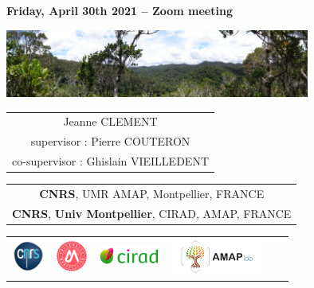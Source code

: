 {

  \begin{frame}
    \begin{center}
        \small{\textbf{Friday, April 30th 2021 -- Zoom meeting}}
    \end{center}
    \vspace{-0.5cm}
    \titlepage %
    \vspace{-2.5cm}
    \begin{center}
      \includegraphics[width=10cm]{figs/Banniere.png}
    \end{center}
    \begin{center}

        \begin{tabular}{c}
          Jeanne CLEMENT \\
          supervisor : Pierre COUTERON \\
          co-supervisor : Ghislain VIEILLEDENT 
        \end{tabular}

      \vspace{0.25cm}

        \begin{tabular}{c}
          \textbf{CNRS}, UMR AMAP, Montpellier, FRANCE\\
          \textbf{CNRS}, \textbf{Univ Montpellier},  CIRAD, AMAP, FRANCE
        \end{tabular}

      \vspace{0.25cm}

      \begin{tabular}{C{2cm}C{2cm}C{2cm}C{2cm}C{3cm}}
        \includegraphics[height=1cm]{figs/logo_CNRS.png} &
        \includegraphics[height=1cm]{figs/logo_UM.jpg} &
        \includegraphics[height=0.7cm]{figs/logo_Cirad.png} &
        \includegraphics[height=1.2cm]{figs/AMAP.jpg} 
        ~
      \end{tabular}

    \end{center}

  \end{frame}
}
\setcounter{framenumber}{0}


